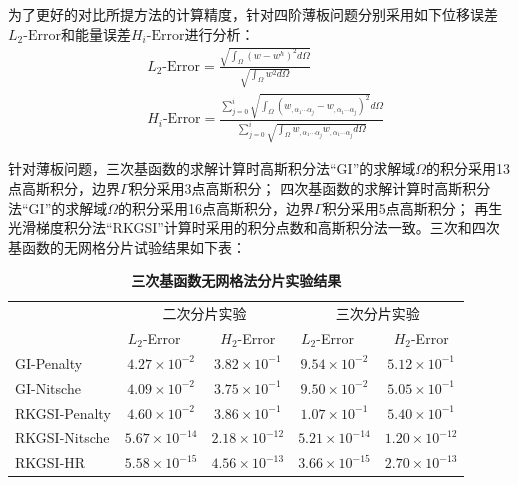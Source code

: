 为了更好的对比所提方法的计算精度，针对四阶薄板问题分别采用如下位移误差$L_2\mbox{-}\text{Error}$和能量误差$H_i\mbox{-}\text{Error}$进行分析：
\begin{equation}
\begin{split}
    &L_2\mbox{-}\text{Error}=\frac{\sqrt{\int_{\Omega}(w-w^h)^2d\Omega}}{\sqrt{\int_{\Omega}w^2d\Omega}}\\
    &H_i\mbox{-}\text{Error}=\frac{\sum_{j=0}^{i}\sqrt{\int_{\Omega}(w_{,\alpha_1\dotsb \alpha_j}-w_{,\alpha_1\dotsb \alpha_j})^2}d\Omega}{\sum_{j=0}^{i}\sqrt{\int_{\Omega}w_{,\alpha_1\dotsb \alpha_j}w_{,\alpha_1\dotsb \alpha_j}d\Omega}}
\end{split}
\end{equation}\par
针对薄板问题，三次基函数的求解计算时高斯积分法“GI”的求解域$\Omega$的积分采用13点高斯积分，边界$\Gamma$积分采用3点高斯积分；
四次基函数的求解计算时高斯积分法“GI”的求解域$\Omega$的积分采用16点高斯积分，边界$\Gamma$积分采用5点高斯积分；
再生光滑梯度积分法“RKGSI”计算时采用的积分点数和高斯积分法一致。三次和四次基函数的无网格分片试验结果如下表：
\begin{table}[H]
    \caption{\textbf{三次基函数无网格法分片实验结果}}
    \centering\label{cubic}
   \begin{tabular}{lcccc}
   \toprule
   & \multicolumn{2}{c}{二次分片实验} & \multicolumn{2}{c}{三次分片实验} \\ \cline{2-5}
   &$L_2$-Error$\quad$&$H_2$-Error&$L_2$-Error$\quad$&$H_2$-Error\\
   \midrule
   GI-Penalty&$4.27\times10^{-2}$&$3.82\times10^{-1}$&$9.54\times10^{-2}$&$5.12\times10^{-1}$\\
   GI-Nitsche&$4.09\times10^{-2}$&$3.75\times10^{-1}$&$9.50\times10^{-2}$&$5.05\times10^{-1}$\\
  RKGSI-Penalty&$4.60\times10^{-2}$&$3.86\times10^{-1}$&$1.07\times10^{-1}$&$5.40\times10^{-1}$\\
  RKGSI-Nitsche&$5.67\times10^{-14}$&$2.18\times10^{-12}$&$5.21\times10^{-14}$&$1.20\times10^{-12}$\\
  RKGSI-HR&$5.58\times10^{-15}$&$4.56\times10^{-13}$&$3.66\times10^{-15}$&$2.70\times10^{-13}$\\
   \bottomrule
   \end{tabular}
   \end{table}
